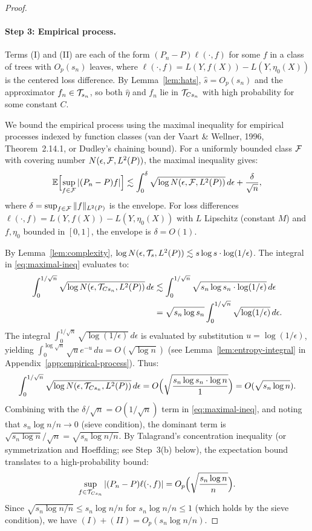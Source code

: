 \documentclass[12pt]{article}
\begin{document}
\begin{proof}
\paragraph{Step 3: Empirical process.}
Terms (I) and (II) are each of the form $(P_n - P)\ell(\cdot,f)$ for some $f$ in a class of trees with $O_p(s_n)$ leaves, where $\ell(\cdot,f) = L(Y,f(X)) - L(Y,\eta_0(X))$ is the centered loss difference. By Lemma~\ref{lem:hats}, $\hat{s} = O_p(s_n)$ and the approximator $f_n \in \mathcal{T}_{s_n}$, so both $\hat\eta$ and $f_n$ lie in $\mathcal{T}_{Cs_n}$ with high probability for some constant $C$.

We bound the empirical process using the maximal inequality for empirical processes indexed by function classes (van der Vaart \& Wellner, 1996, Theorem~2.14.1, or Dudley's chaining bound). For a uniformly bounded class $\mathcal{F}$ with covering number $N(\epsilon, \mathcal{F}, L^2(P))$, the maximal inequality gives:
\begin{equation}
\label{eq:maximal-ineq}
\mathbb{E} \Bigl[ \sup_{f \in \mathcal{F}} |(P_n - P) f| \Bigr] \lesssim \int_0^\delta \sqrt{\log N(\epsilon, \mathcal{F}, L^2(P))} \, d\epsilon + \frac{\delta}{\sqrt{n}},
\end{equation}
where $\delta = \sup_{f \in \mathcal{F}} \|f\|_{L^2(P)}$ is the envelope. For loss differences $\ell(\cdot,f) = L(Y,f(X)) - L(Y,\eta_0(X))$ with $L$ Lipschitz (constant $M$) and $f, \eta_0$ bounded in $[0,1]$, the envelope is $\delta = O(1)$.

By Lemma~\ref{lem:complexity}, $\log N(\epsilon, \mathcal{T}_s, L^2(P)) \lesssim s \log s \cdot \log(1/\epsilon)$. The integral in \eqref{eq:maximal-ineq} evaluates to:
\begin{align*}
\int_0^{1/\sqrt{n}} \sqrt{\log N(\epsilon, \mathcal{T}_{Cs_n}, L^2(P))} \, d\epsilon
&\lesssim \int_0^{1/\sqrt{n}} \sqrt{s_n \log s_n \cdot \log(1/\epsilon)} \, d\epsilon \\
&= \sqrt{s_n \log s_n} \int_0^{1/\sqrt{n}} \sqrt{\log(1/\epsilon)} \, d\epsilon.
\end{align*}
The integral $\int_0^{1/\sqrt{n}} \sqrt{\log(1/\epsilon)} \, d\epsilon$ is evaluated by substitution $u = \log(1/\epsilon)$, yielding $\int_0^{\log \sqrt{n}} \sqrt{u} e^{-u} \, du = O(\sqrt{\log n})$ (see Lemma~\ref{lem:entropy-integral} in Appendix~\ref{app:empirical-process}). Thus:
\[
\int_0^{1/\sqrt{n}} \sqrt{\log N(\epsilon, \mathcal{T}_{Cs_n}, L^2(P))} \, d\epsilon = O\Bigl(\sqrt{\frac{s_n \log s_n \cdot \log n}{1}}\Bigr) = O(\sqrt{s_n \log n}).
\]
Combining with the $\delta/\sqrt{n} = O(1/\sqrt{n})$ term in \eqref{eq:maximal-ineq}, and noting that $s_n \log n / n \to 0$ (sieve condition), the dominant term is $\sqrt{s_n \log n} / \sqrt{n} = \sqrt{s_n \log n / n}$. By Talagrand's concentration inequality (or symmetrization and Hoeffding; see Step~3(b) below), the expectation bound translates to a high-probability bound:
\[
\sup_{f \in \mathcal{T}_{Cs_n}} |(P_n - P) \ell(\cdot,f)| = O_p\Bigl(\sqrt{\frac{s_n \log n}{n}}\Bigr).
\]
Since $\sqrt{s_n \log n / n} \le s_n \log n / n$ for $s_n \log n / n \le 1$ (which holds by the sieve condition), we have $(I) + (II) = O_p(s_n \log n / n)$.


\end{proof}
\end{document}
